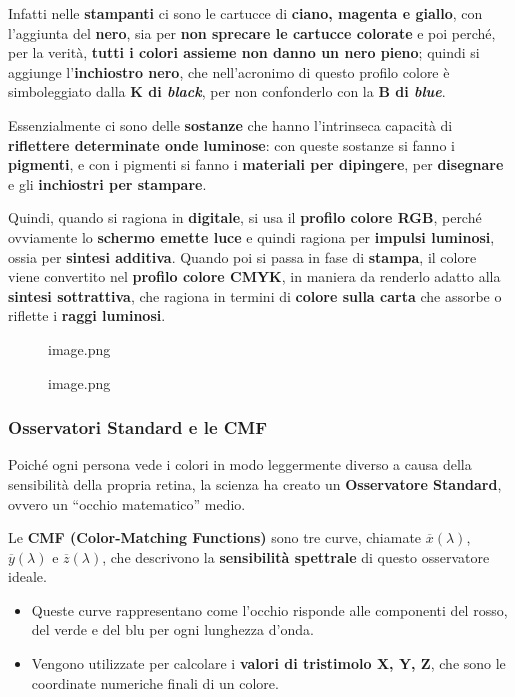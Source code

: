 \documentclass[
]{article}
\providecommand{\tightlist}{%
  \setlength{\itemsep}{0pt}\setlength{\parskip}{0pt}}
\begin{document}
Infatti nelle \textbf{stampanti} ci sono le cartucce di \textbf{ciano, magenta e giallo}, con l'aggiunta del \textbf{nero}, sia per \textbf{non sprecare le cartucce colorate} e poi perché, per la verità, \textbf{tutti i colori assieme non danno un nero pieno}; quindi si aggiunge l'\textbf{inchiostro nero}, che nell'acronimo di questo profilo colore è simboleggiato dalla \textbf{K di \emph{black}}, per non confonderlo con la \textbf{B di \emph{blue}}.

Essenzialmente ci sono delle \textbf{sostanze} che hanno l'intrinseca capacità di \textbf{riflettere determinate onde luminose}: con queste sostanze si fanno i \textbf{pigmenti}, e con i pigmenti si fanno i \textbf{materiali per dipingere}, per \textbf{disegnare} e gli \textbf{inchiostri per stampare}.

Quindi, quando si ragiona in \textbf{digitale}, si usa il \textbf{profilo colore RGB}, perché ovviamente lo \textbf{schermo emette luce} e quindi ragiona per \textbf{impulsi luminosi}, ossia per \textbf{sintesi additiva}. Quando poi si passa in fase di \textbf{stampa}, il colore viene convertito nel \textbf{profilo colore CMYK}, in maniera da renderlo adatto alla \textbf{sintesi sottrattiva}, che ragiona in termini di \textbf{colore sulla carta} che assorbe o riflette i \textbf{raggi luminosi}.

\begin{figure}
\centering
{image.png}
\caption{image.png}
\end{figure}

\hypertarget{osservatori-standard-e-le-cmf}{%
\subsubsection{\texorpdfstring{\textbf{Osservatori Standard e le CMF}}{Osservatori Standard e le CMF}}\label{osservatori-standard-e-le-cmf}}

Poiché ogni persona vede i colori in modo leggermente diverso a causa della sensibilità della propria retina, la scienza ha creato un \textbf{Osservatore Standard}, ovvero un ``occhio matematico'' medio.

Le \textbf{CMF (Color-Matching Functions)} sono tre curve, chiamate \(\overline{x}(\lambda)\), \(\overline{y}(\lambda)\) e \(\overline{z}(\lambda)\), che descrivono la \textbf{sensibilità spettrale} di questo osservatore ideale.

\begin{itemize}
\tightlist
\item
  Queste curve rappresentano come l'occhio risponde alle componenti del rosso, del verde e del blu per ogni lunghezza d'onda.
\item
  Vengono utilizzate per calcolare i \textbf{valori di tristimolo X, Y, Z}, che sono le coordinate numeriche finali di un colore.
\end{itemize}
\end{document}
